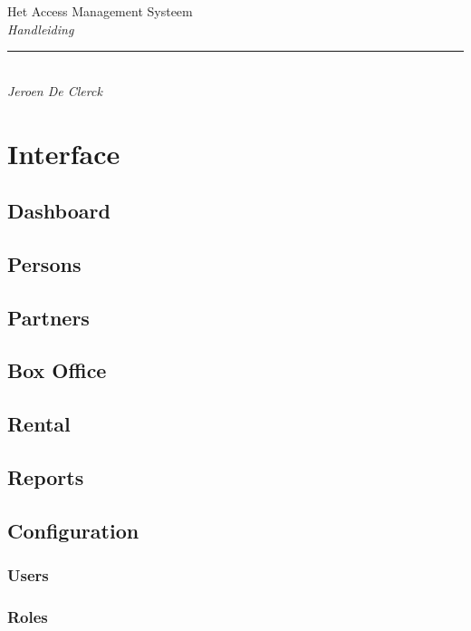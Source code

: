 \documentclass[]{memoir}
\begin{document}
\begingroup%
\centering
\vspace*{0.1\textheight}
{\Huge Het Access Management Systeem}\\[\baselineskip]
{\large\itshape Handleiding}\\[\baselineskip]
\vfill
\rule{0.4\textwidth}{0.4pt}\\[\baselineskip]
{\large\itshape Jeroen De Clerck}\par
\vspace*{0.1\textheight}
\endgroup

\clearpage
\tableofcontents

\chapter{Interface}

\section{Dashboard}

\section{Persons}

\section{Partners}

\section{Box Office}

\section{Rental}

\section{Reports}

\section{Configuration}
\subsection{Users}
\subsection{Roles}
\end{document}
